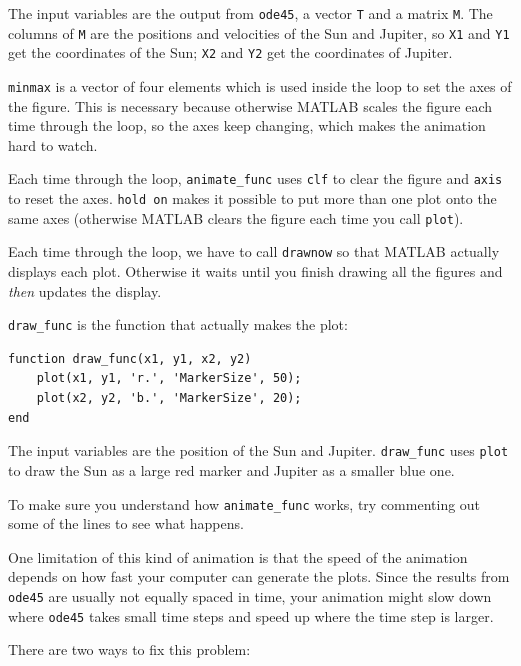 \documentclass[
]{book}
\begin{document}
The input variables are the output from {\tt ode45}, a vector
{\tt T} and a matrix {\tt M}.  The columns of {\tt M} are the
positions and velocities of the Sun and Jupiter, so
{\tt X1} and {\tt Y1} get the coordinates of the Sun;
{\tt X2} and {\tt Y2} get the coordinates of Jupiter.

{\tt minmax} is a vector of four elements which is used inside
the loop to set the axes of the figure.  This is necessary because
otherwise MATLAB scales the figure each time through the loop,
so the axes keep changing, which makes the animation hard
to watch.

Each time through the loop, {\tt animate\_func} uses {\tt clf}
to clear the figure and {\tt axis} to reset the axes.  {\tt hold
on} makes it possible to put more than one plot onto the same
axes (otherwise MATLAB clears the figure each time you call
{\tt plot}).

Each time through the loop, we have to call {\tt drawnow} so
that MATLAB actually displays each plot.  Otherwise it waits
until you finish drawing all the figures and {\em then} updates
the display.

{\tt draw\_func} is the function that actually makes the
plot:

\begin{verbatim}
function draw_func(x1, y1, x2, y2)
    plot(x1, y1, 'r.', 'MarkerSize', 50);
    plot(x2, y2, 'b.', 'MarkerSize', 20);
end
\end{verbatim}

The input variables are the position of the Sun and Jupiter.
{\tt draw\_func} uses {\tt plot} to draw
the Sun as a large red marker and Jupiter as a smaller blue one.

\begin{ex}
To make sure you understand how {\tt animate\_func} works,
try commenting out some of the lines to see what happens.
\end{ex}

One limitation of this kind of animation is that the speed
of the animation depends on how fast your computer can generate
the plots.  Since the results from {\tt ode45} are usually not
equally spaced in time, your animation might slow down where
{\tt ode45} takes small time steps and speed up where the time
step is larger.

There are two ways to fix this problem:
\end{document}
